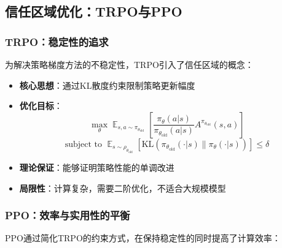 \documentclass[a4paper, 12pt]{article}
\DeclareMathOperator*{\E}{\mathbb{E}}    %
\begin{document}
\subsection{信任区域优化：TRPO与PPO}
\subsubsection{TRPO：稳定性的追求}
为解决策略梯度方法的不稳定性，TRPO引入了信任区域的概念：

\begin{itemize}
    \item \textbf{核心思想}：通过KL散度约束限制策略更新幅度
    \item \textbf{优化目标}：
        \begin{equation}
            \max_\theta \E_{s,a \sim \pi_{\theta_{\text{old}}}}[\frac{\pi_\theta(a|s)}{\pi_{\theta_{\text{old}}}(a|s)} A^{\pi_{\theta_{\text{old}}}}(s,a)]
        \end{equation}
        \begin{equation}
            \text{subject to } \E_{s \sim \rho_{\theta_{\text{old}}}}[\text{KL}(\pi_{\theta_{\text{old}}}(\cdot|s) \| \pi_\theta(\cdot|s))] \leq \delta
        \end{equation}
    \item \textbf{理论保证}：能够证明策略性能的单调改进
    \item \textbf{局限性}：计算复杂，需要二阶优化，不适合大规模模型
\end{itemize}

\subsubsection{PPO：效率与实用性的平衡}
PPO通过简化TRPO的约束方式，在保持稳定性的同时提高了计算效率：
\end{document}
